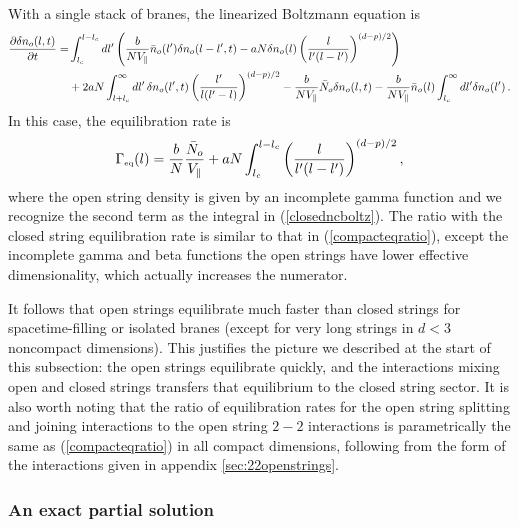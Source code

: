 \documentclass[a4paper,11pt]{article}
\begin{document}
With a single stack of branes, the linearized Boltzmann equation is
\begin{equation}
\begin{split}
\frac{\partial \delta n_o(l,t)}{\partial t}=& 
\int_{l_c}^{l-l_c}{dl'\left(\frac{b}{NV_\parallel } \Bar{n}_o(l')\delta n_o(l-l',t)
-aN \delta n_o(l)\left(\frac{l}{l'(l-l')}\right)^{(d-p)/2}\right)}\\
&+2aN\int_{l+l_c}^\infty {dl'\, \delta n_o(l',t)\left(\frac{l'}{l(l'-l)}\right)^{(d-p)/2}}-\frac{b}{NV_\parallel}\bar{N}_o\delta n_o(l,t) -\frac{b}{N V_\parallel}\Bar{n}_o(l)
\int_{l_c}^\infty dl' \delta n_o(l')\, .
\end{split}
\end{equation}
In this case, the equilibration rate is
\begin{equation}
    \Gamma_{\text{\tiny{eq}}}(l)=\frac{b}{N}\frac{\bar{N}_o}{V_\parallel}+aN
\int_{l_c}^{l-l_c} \left(\frac{l}{l'(l-l')}\right)^{(d-p)/2} ,
\end{equation}
where the open string density is given by an incomplete gamma function
and we recognize the second term as the integral in (\ref{closedncboltz}).
The ratio with the closed string equilibration rate is similar to that in
(\ref{compacteqratio}), except the incomplete gamma and beta functions
the open strings have lower effective dimensionality, which actually increases
the numerator.

It follows that open strings equilibrate much faster than closed strings for spacetime-filling or isolated branes (except for very long strings in $d<3$ 
noncompact dimensions). This justifies the picture we described at the start 
of this subsection: the open strings equilibrate quickly, and the interactions
mixing open and closed strings transfers that equilibrium to the closed string
sector. It is also worth noting that the ratio of equilibration rates
for the open string splitting and joining interactions to the open string
$2-2$ interactions is parametrically the same as (\ref{compacteqratio})
in all compact dimensions, following from the form of the interactions
given in appendix \ref{sec:22openstrings}.


\subsubsection*{An exact partial solution}
\end{document}
